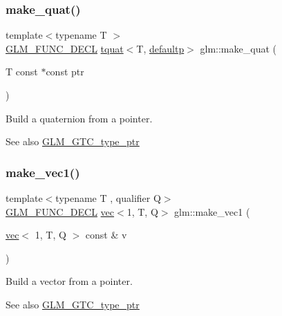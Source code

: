 \subsubsection{\texorpdfstring{make\+\_\+quat()}{make\_quat()}}
{\footnotesize\ttfamily template$<$typename T $>$ \\
\mbox{\hyperlink{setup_8hpp_ab2d052de21a70539923e9bcbf6e83a51}{G\+L\+M\+\_\+\+F\+U\+N\+C\+\_\+\+D\+E\+CL}} \mbox{\hyperlink{structglm_1_1tquat}{tquat}}$<$T, \mbox{\hyperlink{namespaceglm_a36ed105b07c7746804d7fdc7cc90ff25a9d21ccd8b5a009ec7eb7677befc3bf51}{defaultp}}$>$ glm\+::make\+\_\+quat (\begin{DoxyParamCaption}\item[{T const $\ast$const}]{ptr }\end{DoxyParamCaption})}

Build a quaternion from a pointer. \begin{DoxySeeAlso}{See also}
\mbox{\hyperlink{group__gtc__type__ptr}{G\+L\+M\+\_\+\+G\+T\+C\+\_\+type\+\_\+ptr}} 
\end{DoxySeeAlso}
\mbox{\label{group__gtc__type__ptr_ga4135f03f3049f0a4eb76545c4967957c}} 
\subsubsection{\texorpdfstring{make\+\_\+vec1()}{make\_vec1()}\hspace{0.1cm}{\footnotesize\ttfamily [1/4]}}
{\footnotesize\ttfamily template$<$typename T , qualifier Q$>$ \\
\mbox{\hyperlink{setup_8hpp_ab2d052de21a70539923e9bcbf6e83a51}{G\+L\+M\+\_\+\+F\+U\+N\+C\+\_\+\+D\+E\+CL}} \mbox{\hyperlink{structglm_1_1vec}{vec}}$<$1, T, Q$>$ glm\+::make\+\_\+vec1 (\begin{DoxyParamCaption}\item[{\mbox{\hyperlink{structglm_1_1vec}{vec}}$<$ 1, T, Q $>$ const \&}]{v }\end{DoxyParamCaption})\hspace{0.3cm}{\ttfamily [inline]}}

Build a vector from a pointer. \begin{DoxySeeAlso}{See also}
\mbox{\hyperlink{group__gtc__type__ptr}{G\+L\+M\+\_\+\+G\+T\+C\+\_\+type\+\_\+ptr}} 
\end{DoxySeeAlso}
\mbox{\label{group__gtc__type__ptr_ga13c92b81e55f201b052a6404d57da220}} 
